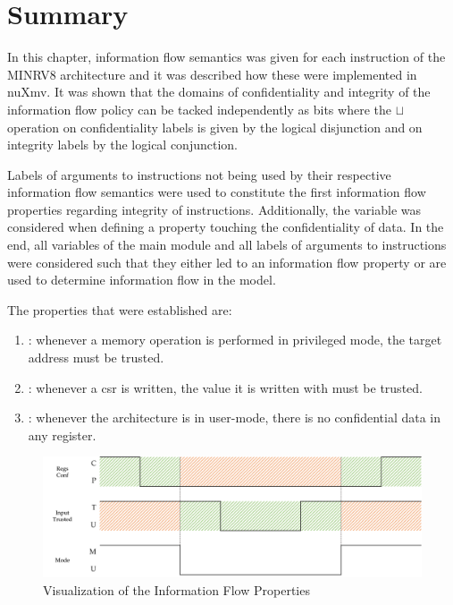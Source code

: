 \section{Summary}

In this chapter, information flow semantics was given for each instruction of the MINRV8 architecture and it was described how these were implemented in nuXmv.
It was shown that the domains of confidentiality and integrity of the information flow policy can be tacked independently as bits where the $ \sqcup $ operation on confidentiality labels is given by the logical disjunction and on integrity labels by the logical conjunction.

Labels of arguments to instructions not being used by their respective information flow semantics were used to constitute the first information flow properties regarding integrity of instructions.
Additionally, the  variable was considered when defining a property touching the confidentiality of data.
In the end, all variables of the main module and all labels of arguments to instructions were considered such that they either led to an information flow property or are used to determine information flow in the model.

The properties that were established are:
\begin{enumerate}[label=\Roman*.]
    \item {}: whenever a memory operation is performed in privileged mode, the target address must be trusted.
    \item {}: whenever a \gls{csr} is written, the value it is written with must be trusted.
    \item {}: whenever the architecture is in user-mode, there is no confidential data in any register.
\end{enumerate}

\begin{figure}
    \includegraphics[width=\textwidth]{figures/properties.png}
    \caption{Visualization of the Information Flow Properties}
    \label{fig:ifc-properties}
\end{figure}

